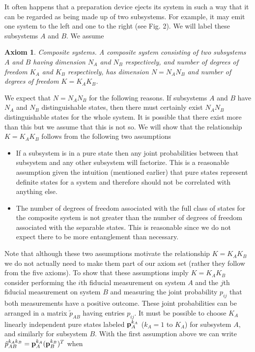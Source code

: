 \documentclass[12pt]{article}
\newtheorem{axiom}{Axiom}
\begin{document}
It often happens that a preparation device ejects its system in such a
way that it can be regarded as being made up of two subsystems.  For
example, it may emit one system to the left and one to the right (see
Fig. 2).  We will label these subsystems $A$ and $B$.  We assume
\begin{axiom} {\rm Composite systems.}  A composite system consisting of two
subsystems $A$ and $B$ having dimension $N_A$ and $N_B$
respectively, and number of degrees of freedom $K_A$ and $K_B$
respectively, has dimension $N=N_AN_B$ and number of degrees of freedom
$K=K_AK_B$.
\end{axiom}
We expect that $N=N_AN_B$ for the following reasons. If
subsystems $A$ and $B$ have $N_A$ and $N_B$ distinguishable states, then
there must certainly exist $N_AN_B$ distinguishable states for the
whole system.  It is possible that there exist more than this but we
assume that this is not so.
We will show that the relationship $K=K_AK_B$ follows from the following
two assumptions
\begin{itemize}
\item If a subsystem is in a pure state then any joint probabilities
between that subsystem and any other subsystem will factorize.  This is
a reasonable assumption given the intuition (mentioned earlier)
that pure states represent definite states for a system and therefore
should not be correlated with anything else.
\item The number of degrees of freedom associated with the full class of
states for the composite system is not greater than the number of
degrees of freedom associated with the separable states.  This is
reasonable since we do not expect there to be more entanglement than
necessary.
\end{itemize}
Note that although these two assumptions motivate the relationship
$K=K_AK_B$ we do not actually need to make them part of our axiom set
(rather they follow from the five axioms).
To show that these assumptions imply $K=K_AK_B$ consider
performing the $i$th
fiducial measurement on system $A$ and the $j$th fiducial measurement on
system $B$ and measuring the joint probability $p_{ij}$ that both
measurements have a positive outcome. These joint probabilities can be
arranged in a matrix $\tilde{p}_{AB}$ having entries $p_{ij}$.
It must be possible to choose $K_A$ linearly independent pure states
labeled ${\bf p}^{k_A}_A$ ($k_A=1$ to $K_A$) for subsystem $A$, and
similarly for subsystem $B$. With the first assumption above we can write
$\tilde{p}^{k_A k_B}_{AB}={\bf p}^{k_A}_A({\bf p}_B^{k_B})^T$ when
\end{document}
